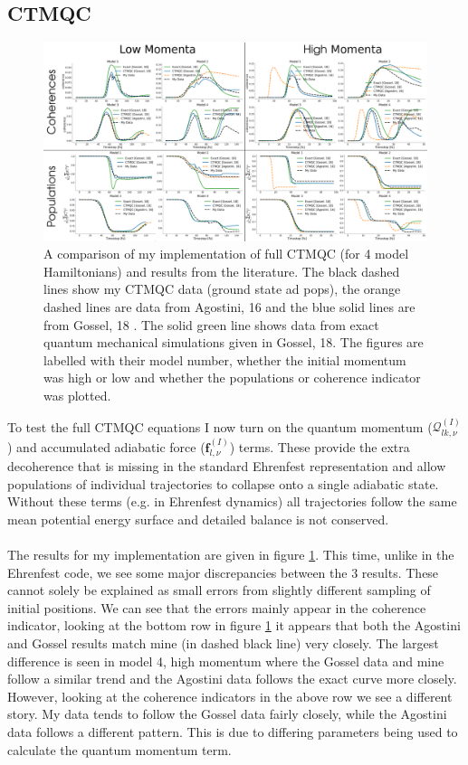 \subsection{CTMQC}
\begin{figure}[h]
	\includegraphics[width=\textwidth]{img/CTMQC/TullyModels/CTMQC_LitComp.png}
	\caption{\label{fig:LitCompCTMQCTully}A comparison of my implementation of full CTMQC (for 4 model Hamiltonians) and results from the literature. The black dashed lines show my CTMQC data (ground state ad pops), the orange dashed lines are data from Agostini, 16 \cite{agostini_quantum-classical_2016} and the blue solid lines are from Gossel, 18 \cite{gossel_coupled-trajectory_2018}. The solid green line shows data from exact quantum mechanical simulations given in Gossel, 18. The figures are labelled with their model number, whether the initial momentum was high or low and whether the populations or coherence indicator was plotted.}
\end{figure}
To test the full CTMQC equations I now turn on the quantum momentum ($\mathcal{Q}_{lk, \nu}^{(I)}$) and accumulated adiabatic force ($\mathbf{f}_{l, \nu}^{(I)}$) terms. These provide the extra decoherence that is missing in the standard Ehrenfest representation and allow populations of individual trajectories to collapse onto a single adiabatic state. Without these terms (e.g. in Ehrenfest dynamics) all trajectories follow the same mean potential energy surface and detailed balance is not conserved.
\\\\
The results for my implementation are given in figure \ref{fig:LitCompCTMQCTully}. This time, unlike in the Ehrenfest code, we see some major discrepancies between the 3 results. These cannot solely be explained as small errors from slightly different sampling of initial positions. We can see that the errors mainly appear in the coherence indicator, looking at the bottom row in figure \ref{fig:LitCompCTMQCTully} it appears that both the Agostini and Gossel results match mine (in dashed black line) very closely. The largest difference is seen in model 4, high momentum where the Gossel data and mine follow a similar trend and the Agostini data follows the exact curve more closely. However, looking at the coherence indicators in the above row we see a different story. My data tends to follow the Gossel data fairly closely, while the Agostini data follows a different pattern. This is due to differing parameters being used to calculate the quantum momentum term.

